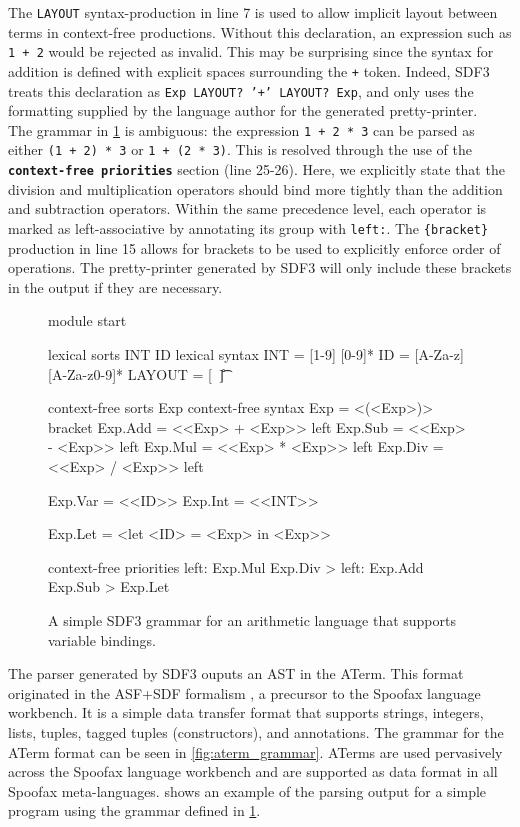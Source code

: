 The \texttt{LAYOUT} syntax-production in line 7 is used to allow implicit layout between terms in context-free productions. Without this declaration, an expression such as \texttt{1 + 2} would be rejected as invalid. This may be surprising since the syntax for addition is defined with explicit spaces surrounding the \texttt{+} token. Indeed, SDF3 treats this declaration as \texttt{Exp LAYOUT? '+' LAYOUT? Exp}, and only uses the formatting supplied by the language author for the generated pretty-printer.\\

The grammar in \cref{fig:sdf3_example} is ambiguous: the expression \texttt{1 + 2 * 3} can be parsed as either \texttt{(1 + 2) * 3} or \texttt{1 + (2 * 3)}. This is resolved through the use of the \textbf{\texttt{context-free priorities}} section (line 25-26). Here, we explicitly state that the division and multiplication operators should bind more tightly than the addition and subtraction operators. Within the same precedence level, each operator is marked as left-associative by annotating its group with \texttt{left:}. The \texttt{\{bracket\}} production in line 15 allows for brackets to be used to explicitly enforce order of operations. The pretty-printer generated by SDF3 will only include these brackets in the output if they are necessary.\\

\begin{figure}
  \begin{sdf3}
module start

lexical sorts INT ID
lexical syntax
  INT = [1-9] [0-9]*
  ID = [A-Za-z] [A-Za-z0-9]*
  LAYOUT = [\ \n\r\t]

context-free sorts Exp
context-free syntax
  Exp = <(<Exp>)> {bracket}
  Exp.Add = <<Exp> + <Exp>> {left}
  Exp.Sub = <<Exp> - <Exp>> {left}
  Exp.Mul = <<Exp> * <Exp>> {left}
  Exp.Div = <<Exp> / <Exp>> {left}

  Exp.Var = <<ID>>
  Exp.Int = <<INT>>

  Exp.Let = <let <ID> = <Exp> in <Exp>>

context-free priorities
  {left: Exp.Mul Exp.Div} > {left: Exp.Add Exp.Sub} > {Exp.Let}
  \end{sdf3}
  \caption{A simple SDF3 grammar for an arithmetic language that supports variable bindings.}
  \label{fig:sdf3_example}
\end{figure}

The parser generated by SDF3 ouputs an \ac{AST} in the \acf{ATerm}. This format originated in the ASF+SDF formalism \cite{DHP:1996}, a precursor to the Spoofax language workbench. It is a simple data transfer format that supports strings, integers, lists, tuples, tagged tuples (constructors), and annotations. The grammar for the ATerm format can be seen in \cref{fig:aterm_grammar}. \acp{ATerm} are used pervasively across the Spoofax language workbench and are supported as data format in all Spoofax meta-languages.  shows an example of the parsing output for a simple program using the grammar defined in \cref{fig:sdf3_example}.\\

